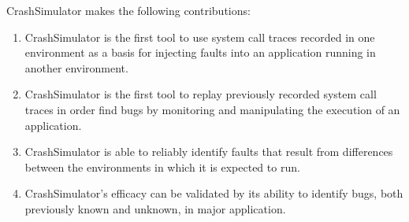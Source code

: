 CrashSimulator makes the following contributions:

    \begin{enumerate}
        \item{CrashSimulator is the first tool to use system call traces recorded in one environment as a basis for
            injecting faults into an application running in another
            environment. }
        \item{CrashSimulator is the first tool to replay previously recorded system call traces in order find bugs by
            monitoring and manipulating the execution of an
            application. }
        \item{CrashSimulator is able to reliably identify faults that result from differences between the environments
            in which it is expected to run. }
        \item{CrashSimulator's efficacy can be validated by its ability to identify bugs, both previously known and
            unknown, in major application. }
    \end{enumerate}

